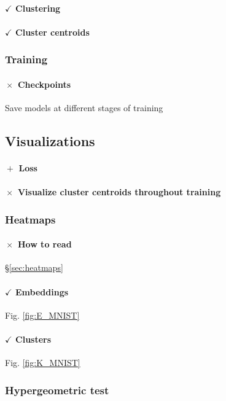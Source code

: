 \paragraph{$\boxed{\checkmark}$ Clustering}
\paragraph{$\boxed{\checkmark}$ Cluster centroids}
\subsubsection{Training}

\paragraph{$\boxed{\times}$ Checkpoints}
Save models at different stages of training

\subsection{Visualizations}

\paragraph{$\boxed{+}$ Loss}
\paragraph{$\boxed{\times}$ Visualize cluster centroids throughout training}

\subsubsection{Heatmaps}

\paragraph{$\boxed{\times}$ How to read}
\S \ref{sec:heatmaps}
\paragraph{$\boxed{\checkmark}$ Embeddings}
Fig. \ref{fig:E_MNIST}
\paragraph{$\boxed{\checkmark}$ Clusters}
Fig. \ref{fig:K_MNIST}
\subsubsection{Hypergeometric test}

